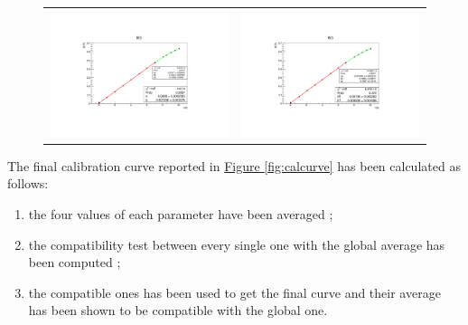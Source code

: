 \documentclass[a4paper,12pt,abstracton]{scrartcl}
\begin{document}
\begin{figure}[H] \hspace{-0.8cm}
    \begin{tabular}{c c}
      \includegraphics[scale=0.46]{plots/BIcre2.pdf}  &\hspace{0.1cm} \includegraphics[scale=0.46]{plots/BIdec2.pdf} \\
      \end{tabular}
    \caption{}
    \label{fig:BI2}
\end{figure}
\clearpage
The final calibration curve reported in \hyperref[fig:calcurve]{Figure \ref*{fig:calcurve}} has been calculated as follows: 
\begin{enumerate}
    \item the four values of each parameter have been averaged ;
    \item the compatibility test between every single one with the global average has been computed ;
    \item the compatible ones has been used to get the final curve and their average has been shown to be compatible with the global one.
\end{enumerate}
\end{document}
